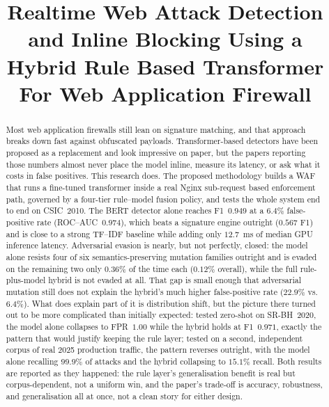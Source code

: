\documentclass[conference]{IEEEtran}
\begin{document}
\title{Realtime Web Attack Detection and Inline Blocking Using a Hybrid
Rule Based Transformer For Web Application Firewall}

\author{
\and
{}
}

\maketitle

\begin{abstract}
Most web application firewalls still lean on signature matching, and that
approach breaks down fast against obfuscated payloads. Transformer-based
detectors have been proposed as a replacement and look impressive on paper,
but the papers reporting those numbers almost never place the model inline,
measure its latency, or ask what it costs in false positives. This research
does. The proposed methodology builds a WAF that runs a fine-tuned transformer inside a real
Nginx sub-request based enforcement path, governed by a four-tier
rule--model fusion policy, and tests the whole system end to end on
CSIC~2010. The BERT detector alone reaches F1~$0.949$ at a $6.4\%$
false-positive rate (ROC--AUC~$0.974$), which beats a signature engine
outright ($0.567$ F1) and is close to a strong TF--IDF baseline while adding
only $12.7$~ms of median GPU inference latency. Adversarial evasion is
nearly, but not perfectly, closed: the model alone resists four of six
semantics-preserving mutation families outright and is evaded on the
remaining two only $0.36\%$ of the time each ($0.12\%$ overall), while the
full rule-plus-model hybrid is not evaded at all. That gap is small enough
that adversarial mutation still does not explain the hybrid's much higher
false-positive rate ($22.9\%$ vs.\ $6.4\%$). What does explain part of it is
distribution shift, but the picture there turned out to be more complicated
than initially expected: tested zero-shot on SR-BH~2020, the model alone collapses
to FPR~$1.00$ while the hybrid holds at F1~$0.971$, exactly the pattern that
would justify keeping the rule layer; tested on a second, independent
corpus of real 2025 production traffic, the pattern reverses outright, with
the model alone recalling $99.9\%$ of attacks and the hybrid collapsing to
$15.1\%$ recall. Both results are reported as they happened: the rule layer's
generalisation benefit is real but corpus-dependent, not a uniform win, and
the paper's trade-off is accuracy, robustness, and generalisation all at
once, not a clean story for either design.
\end{abstract}
\end{document}
